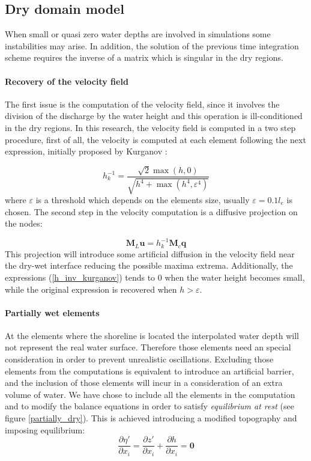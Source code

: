 \documentclass[a4paper,12pt]{article}
\newcommand{\pder}[2]{\frac{\partial#1}{\partial#2}}
\begin{document}
\subsection{Dry domain model}

When small or quasi zero water depths are involved in simulations some instabilities may arise. In addition, the solution of the previous time integration scheme requires the inverse of a matrix which is singular in the dry regions. 

\paragraph{Recovery of the velocity field}
The first issue is the computation of the velocity field, since it involves the division of the discharge by the water height and this operation is ill-conditioned in the dry regions. In this research, the velocity field is computed in a two step procedure, first of all, the velocity is computed at each element following the next expression, initially proposed by Kurganov \cite{kurganov2007}:

\begin{equation} \label{h_inv_kurganov}
h^{-1}_k = \frac{\sqrt{2}\max(h,0)}{\sqrt{h^4 + \max(h^4, \varepsilon^4)}}
\end{equation}
where $\varepsilon$ is a threshold which depends on the elements size, usually $\varepsilon = 0.1 l_e$ is chosen. The second step in the velocity computation is a diffusive projection on the nodes:

\begin{equation}
\mathbf{M}_L \mathbf{u} = h^{-1}_k \mathbf{M}_c \mathbf{q}
\end{equation}
This projection will introduce some artificial diffusion in the velocity field near the dry-wet interface reducing the possible maxima extrema. Additionally, the expressions (\ref{h_inv_kurganov}) tends to $0$ when the water height becomes small, while the original expression is recovered when $h>\varepsilon$.


\paragraph{Partially wet elements}
At the elements where the shoreline is located the interpolated water depth will not represent the real water surface. Therefore those elements need an special consideration in order to prevent unrealistic oscillations. Excluding those elements from the computations is equivalent to introduce an artificial barrier, and the inclusion of those elements will incur in a consideration of an extra volume of water. We have chose to include all the elements in the computation and to modify the balance equations in order to satisfy \emph{equilibrium at rest} (see figure \ref{partially_dry}). This is achieved introducing a modified topography and imposing equilibrium:
\begin{equation}
    \pder{\eta'}{x_i} = \pder{z'}{x_i} + \pder{h}{x_i} = \mathbf{0}
\end{equation}
\end{document}
